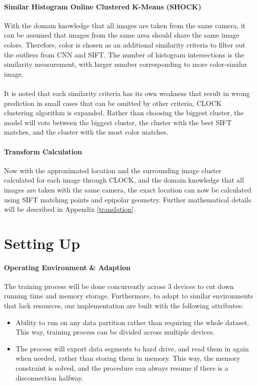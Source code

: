 \documentclass[11pt]{article}
\begin{document}
\begin{multicols}{2}
\paragraph{Similar Histogram Online Clustered K-Means (SHOCK)} With the domain knowledge that all images are taken from the same camera, it can be assumed that images from the same area should share the same image colors. Therefore, color is chosen as an additional similarity criteria to filter out the outliers from CNN and SIFT. The number of histogram intersections is the similarity measurement, with larger number corresponding to more color-similar image.\\~\\
It is noted that each similarity criteria has its own weakness that result in wrong prediction in small cases that can be omitted by other criteria, CLOCK clustering algorithm is expanded. Rather than choosing the biggest cluster, the model will vote between the biggest cluster, the cluster with the best SIFT matches, and the cluster with the most color matches.

\paragraph{Transform Calculation} Now with the approximated location and the surrounding image cluster calculated for each image through CLOCK, and the domain knowledge that all images are taken with the same camera, the exact location can now be calculated using SIFT matching points and epipolar geometry. Further mathematical details will be described in Appendix \ref{translation}.

\section{Setting Up}

\paragraph{Operating Environment \& Adaption} The training process will be done concurrently across 3 devices to cut down running time and memory storage. Furthermore, to adapt to similar environments that lack resources, our implementation are built with the following attributes:
\begin{itemize}
    \item Ability to run on any data partition rather than requiring the whole dataset. This way, training process can be divided across multiple devices.
    \item The process will export data segments to hard drive, and read them in again when needed, rather than storing them in memory. This way, the memory constraint is solved, and the procedure can always resume if there is a disconnection halfway. 
\end{itemize}


\end{multicols}
\end{document}
